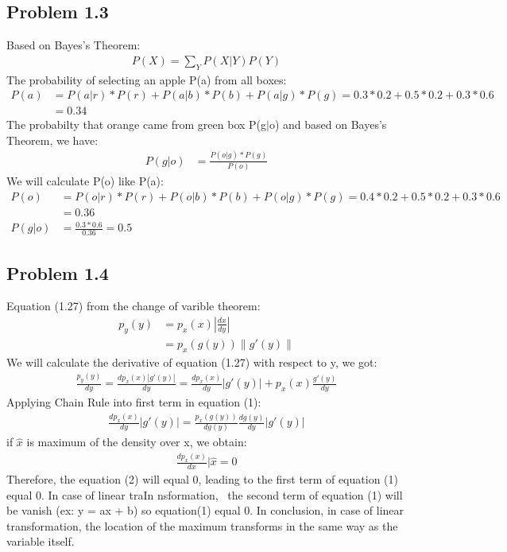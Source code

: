 \documentclass[12pt]{article}
\begin{document}
    \subsection*{Problem 1.3}
    Based on Bayes's Theorem:
    \begin{align*}
        P(X) = \sum_{Y}P(X|Y)P(Y)
    \end{align*}
    The probability of selecting an apple P(a) from all boxes:
    \begin{align*}
        P(a) & = P(a|r) * P(r) + P(a|b) * P(b) + P(a|g) * P(g) = 0.3 * 0.2 + 0.5 * 0.2 + 0.3 * 0.6 \\
             & = 0.34
    \end{align*}
    The probabilty that orange came from green box P(g$|$o) and based on Bayes's Theorem, we have:
    \begin{align*}
        P(g|o) & = \frac{P(o|g) * P(g)}{P(o)}
    \end{align*}
    We will calculate P(o) like P(a):
    \begin{align*}
        P(o) & = P(o|r) * P(r) + P(o|b) * P(b) + P(o|g) * P(g) = 0.4 * 0.2 + 0.5 * 0.2 + 0.3 * 0.6 \\
             & = 0.36 \\
        P(g|o) & = \frac{0.3 * 0.6}{0.36} = 0.5
    \end{align*}

    \subsection*{Problem 1.4}
    Equation (1.27) from the change of varible theorem:
    \begin{align*}
        p_y(y) & = p_x(x)|\frac{dx}{dy}| \\
        & = p_x(g(y))\|g'(y)\|
    \end{align*}
    We will calculate the derivative of equation (1.27) with respect to y, we got:
    \begin{align}
        \frac{p_y(y)}{dy} = \frac{dp_x(x)|g'(y)|}{dy} = \frac{dp_x(x)}{dy}|g'(y)| + p_x(x)\frac{g'(y)}{dy}
    \end{align}
    Applying Chain Rule into first term in equation (1):
    \begin{align}
        \frac{dp_x(x)}{dy}|g'(y)| = \frac{p_x(g(y))}{dg(y)}\frac{dg(y)}{dy}|g'(y)|
    \end{align}
    if $\hat{x}$ is maximum of the density over x, we obtain:
    \begin{align*}
        \frac{dp_x(x)}{dx}|\hat{x} = 0
    \end{align*}
    Therefore, the equation (2) will equal 0, leading to the first term of equation (1) equal 0. In case of linear traIn nsformation, \
    the second term of equation (1) will be vanish (ex: y = ax + b) so equation(1) equal 0.
    In conclusion, in case of linear transformation, the location of the maximum transforms in the same way as the variable itself.
\end{document}
